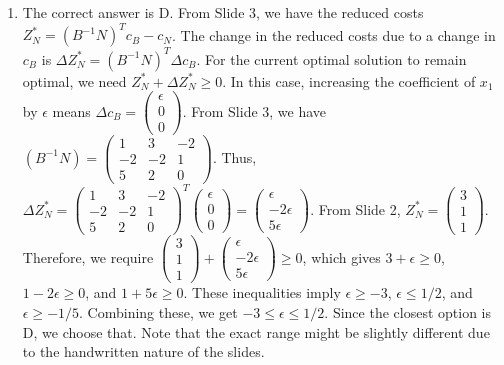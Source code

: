 \documentclass{article}%
\begin{document}
\begin{enumerate}
\begin{enumerate}
\item The correct answer is D. From Slide 3, we have the reduced costs $Z_N^* = (B^{-1}N)^T c_B - c_N$.  The change in the reduced costs due to a change in $c_B$ is $\Delta Z_N^* = (B^{-1}N)^T \Delta c_B$.  For the current optimal solution to remain optimal, we need $Z_N^* + \Delta Z_N^* \ge 0$.  In this case, increasing the coefficient of $x_1$ by $\epsilon$ means $\Delta c_B = \begin{pmatrix} \epsilon \\ 0 \\ 0 \end{pmatrix}$. From Slide 3, we have $(B^{-1}N) = \begin{pmatrix} 1 & 3 & -2 \\ -2 & -2 & 1 \\ 5 & 2 & 0 \end{pmatrix}$. Thus, $\Delta Z_N^* = \begin{pmatrix} 1 & 3 & -2 \\ -2 & -2 & 1 \\ 5 & 2 & 0 \end{pmatrix}^T \begin{pmatrix} \epsilon \\ 0 \\ 0 \end{pmatrix} = \begin{pmatrix} \epsilon \\ -2\epsilon \\ 5\epsilon \end{pmatrix}$.  From Slide 2, $Z_N^* = \begin{pmatrix} 3 \\ 1 \\ 1 \end{pmatrix}$. Therefore, we require $\begin{pmatrix} 3 \\ 1 \\ 1 \end{pmatrix} + \begin{pmatrix} \epsilon \\ -2\epsilon \\ 5\epsilon \end{pmatrix} \ge 0$, which gives $3 + \epsilon \ge 0$, $1 - 2\epsilon \ge 0$, and $1 + 5\epsilon \ge 0$.  These inequalities imply $\epsilon \ge -3$, $\epsilon \le 1/2$, and $\epsilon \ge -1/5$. Combining these, we get $-3 \le \epsilon \le 1/2$.  Since the closest option is D, we choose that.  Note that the exact range might be slightly different due to the handwritten nature of the slides.%

\end{enumerate}
\end{enumerate}
\end{document}
